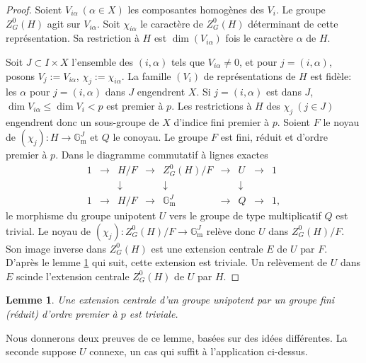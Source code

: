 \documentclass[11pt,a4paper]{article}
\theoremstyle{plain}
\newtheorem{lemma}[theorem]{Lemme}
\theoremstyle{definition}
\newcommand{\Gm}{\mathbb{G}_\mathrm{m}}
\begin{document}
\begin{proof}
Soient $V_{i\alpha}\ (\alpha \in X)$ les composantes homog\`enes des $V_i$. Le groupe $Z^0_G(H)$ agit sur $V_{i\alpha}$. Soit $\chi_{i\alpha}$ le caract\`ere de $Z^0_G(H)$ d\'eterminant de cette repr\'esentation. Sa restriction \`a $H$ est $\dim(V_{i\alpha})$ fois le caract\`ere $\alpha$ de $H$.

Soit $J \subset I \times X$ l'ensemble des $(i,\alpha)$ tels que $V_{i\alpha} \neq 0$, et pour $j = (i,\alpha)$, posons $V_j := V_{i\alpha}$, $\chi_j := \chi_{i\alpha}$. La famille $(V_i)$ de repr\'esentations de $H$ est fid\`ele: les $\alpha$ pour $j = (i,\alpha)$ dans $J$ engendrent $X$. Si $j = (i,\alpha)$ est dans $J$, $\dim V_{i\alpha} \leq \dim V_i < p$ est premier \`a $p$. Les restrictions \`a $H$ des $\chi_j\ (j \in J)$ engendrent donc un sous-groupe de $X$ d'indice fini premier \`a $p$. Soient $F$ le noyau de $(\chi_j): H \to \Gm^J$ et $Q$ le conoyau. Le groupe $F$ est fini, r\'eduit et d'ordre premier \`a $p$. Dans le diagramme commutatif \`a lignes exactes
\[
\begin{array}{ccccccccc}
1 & \longrightarrow & H/F & \longrightarrow & Z^0_G(H)/F & \longrightarrow & U & \longrightarrow & 1 \\
  &                 & \downarrow &                 & \downarrow &                 & \downarrow &                 &   \\
1 & \longrightarrow & H/F & \longrightarrow & \Gm^J & \longrightarrow & Q & \longrightarrow & 1,
\end{array}
\]
le morphisme du groupe unipotent $U$ vers le groupe de type multiplicatif $Q$ est trivial. Le noyau de $(\chi_j): Z^0_G(H)/F \to \Gm^J$ rel\`eve donc $U$ dans $Z^0_G(H)/F$. Son image inverse dans $Z^0_G(H)$ est une extension centrale $E$ de $U$ par $F$. D'apr\`es le lemme \ref{lem:1.8} qui suit, cette extension est triviale. Un rel\`evement de $U$ dans $E$ scinde l'extension centrale $Z^0_G(H)$ de $U$ par $H$.
\end{proof}

\begin{lemma}\label{lem:1.8}
Une extension centrale d'un groupe unipotent par un groupe fini (r\'eduit) d'ordre premier \`a $p$ est triviale.
\end{lemma}

Nous donnerons deux preuves de ce lemme, bas\'ees sur des id\'ees diff\'erentes. La seconde suppose $U$ connexe, un cas qui suffit \`a l'application ci-dessus.
\end{document}
